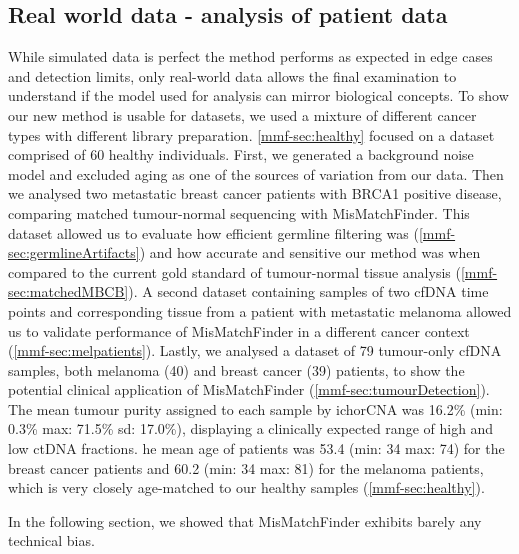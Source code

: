 
\subsection{Real world data - analysis of patient data}
\label{mmf-sec:realworld}

While simulated data is perfect  the method performs as expected in edge cases and  detection limits, only real-world data allows the final examination to understand if the model used for analysis can mirror biological concepts. To show  our new method is usable for  datasets, we used a mixture of different cancer types with different library preparation. \autoref{mmf-sec:healthy} focused on  a dataset comprised of 60  healthy individuals. First, we generated a background noise model and excluded aging as one of the sources of variation from our data. Then we analysed two metastatic breast cancer patients with BRCA1 positive disease, comparing matched tumour-normal sequencing with MisMatchFinder. This dataset allowed us to evaluate how efficient germline filtering was (\autoref{mmf-sec:germlineArtifacts}) and how accurate and sensitive our method was when compared to the current gold standard of tumour-normal tissue analysis (\autoref{mmf-sec:matchedMBCB}).
A second dataset containing samples of two cfDNA time points and corresponding tissue from a patient with metastatic melanoma allowed us to validate  performance of MisMatchFinder in a different cancer context (\autoref{mmf-sec:melpatients}). Lastly, we analysed a dataset of 79 tumour-only cfDNA samples, both melanoma (40) and breast cancer (39) patients, to show the potential clinical application of MisMatchFinder (\autoref{mmf-sec:tumourDetection}). The mean tumour purity assigned to each sample by ichorCNA was 16.2\% (min: 0.3\% max: 71.5\% sd: 17.0\%), displaying a clinically expected range of high and low ctDNA fractions. he mean age of patients was 53.4 (min: 34 max: 74) for the breast cancer patients and 60.2 (min: 34 max: 81) for the melanoma patients, which is very closely age-matched to our healthy samples (\autoref{mmf-sec:healthy}).

In the following section, we showed that MisMatchFinder exhibits barely any technical bias.

